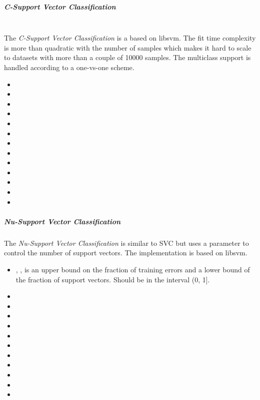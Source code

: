 \subparagraph{C-Support Vector Classification}
\mbox{}
\\The \textit{C-Support Vector Classification} is a based on libsvm.
%
The fit time complexity is more than quadratic with the number of samples which
makes it hard to scale to datasets with more than a couple of 10000 samples.
%
The multiclass support is handled according to a one-vs-one scheme.
%
\begin{itemize}
  \item {}
  \item {}
  \item {}
  \item {}
  \item {}
  \item {}
  \item {}
  \item \tolSVMDescription{}
  \item \cacheSizeDescription{}
  \item \classWeightDescription{}
  \item {}
  \item {}
  \item {}
\end{itemize}

\subparagraph{Nu-Support Vector Classification}
\mbox{}

The \textit{Nu-Support Vector Classification} is similar to SVC but uses a
parameter to control the number of support vectors.
%
The implementation is based on libsvm.
%
\begin{itemize}
  \item {}, , is an upper bound on the
  fraction of training errors and a lower bound of the fraction of support
  vectors.
  Should be in the interval (0, 1].
  \item {}
  \item {}
  \item {}
  \item {}
  \item {}
  \item {}
  \item \tolSVMDescription{}
  \item \cacheSizeDescription{}
  \item {}
  \item {}
  \item {}
\end{itemize}


